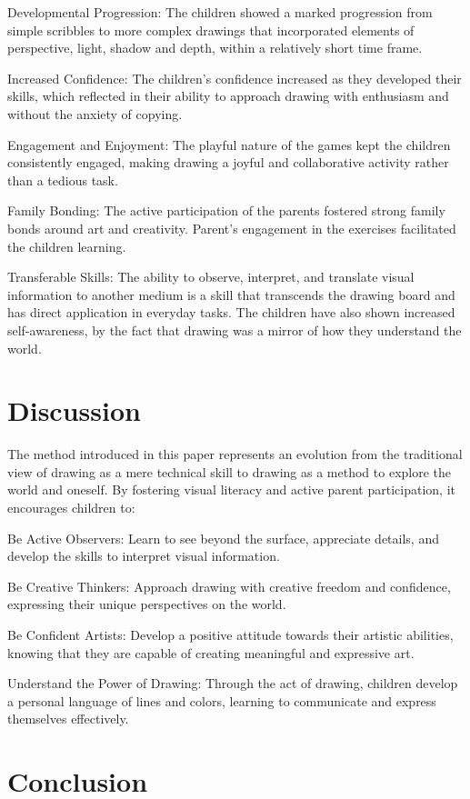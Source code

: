 \documentclass{article}
\begin{document}
Developmental Progression: The children showed a marked progression from simple scribbles to more complex drawings that incorporated elements of perspective, light, shadow and depth, within a relatively short time frame.

Increased Confidence: The children’s confidence increased as they developed their skills, which reflected in their ability to approach drawing with enthusiasm and without the anxiety of copying.

Engagement and Enjoyment: The playful nature of the games kept the children consistently engaged, making drawing a joyful and collaborative activity rather than a tedious task.

Family Bonding: The active participation of the parents fostered strong family bonds around art and creativity. Parent’s engagement in the exercises facilitated the children learning.

Transferable Skills: The ability to observe, interpret, and translate visual information to another medium is a skill that transcends the drawing board and has direct application in everyday tasks. The children have also shown increased self-awareness, by the fact that drawing was a mirror of how they understand the world.

\section{Discussion}

The method introduced in this paper represents an evolution from the traditional view of drawing as a mere technical skill to drawing as a method to explore the world and oneself. By fostering visual literacy and active parent participation, it encourages children to:

Be Active Observers: Learn to see beyond the surface, appreciate details, and develop the skills to interpret visual information.

Be Creative Thinkers: Approach drawing with creative freedom and confidence, expressing their unique perspectives on the world.

Be Confident Artists: Develop a positive attitude towards their artistic abilities, knowing that they are capable of creating meaningful and expressive art.

Understand the Power of Drawing: Through the act of drawing, children develop a personal language of lines and colors, learning to communicate and express themselves effectively.

\section{Conclusion}
\end{document}
